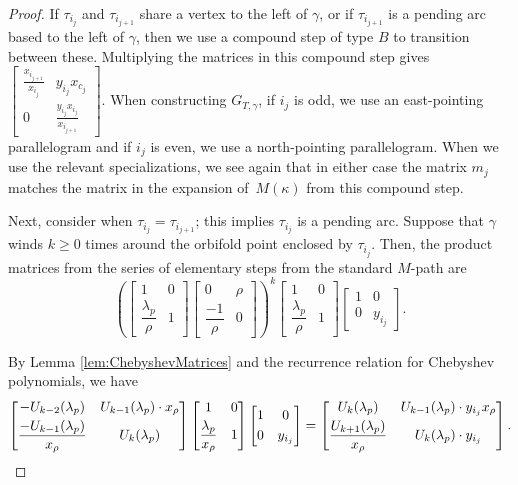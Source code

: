\documentclass[pdftex]{sigma}%
\numberwithin{equation}{section}
\begin{document}
\begin{proof}
If $\tau_{i_j}$ and $\tau_{i_{j+1}}$ share a vertex to the left of $\gamma$, or if $\tau_{i_{j+1}}$ is a pending arc based to the left of $\gamma$, then we use a compound step of type $B$ to transition between these. Multiplying the matrices in this compound step gives $\left[\begin{smallmatrix} \frac{x_{i_{j+1}}}{x_{i_j}} & y_{i_j}x_{c_j} \\ 0 & \frac{y_{i_j}x_{i_j}}{x_{i_{j+1}}} \end{smallmatrix}\right] $. When constructing $G_{T,\gamma}$, if $i_j$ is odd, we use an east-pointing parallelogram and if $i_j$ is even, we use a north-pointing parallelogram. When we use the relevant specializations, we see again that in either case the matrix $m_j$ matches the matrix in the expansion of~$M(\kappa)$ from this compound step.

Next, consider when $\tau_{i_j} = \tau_{i_{j+1}}$; this implies $\tau_{i_j}$ is a pending arc. Suppose that $\gamma$ winds $k \geq 0$ times around the orbifold point enclosed by $\tau_{i_j}$. Then, the product matrices from the series of elementary steps from the standard $M$-path are \[
\left( \begin{bmatrix} 1 & 0 \\ \dfrac{\lambda_p}{\rho} & 1 \end{bmatrix} \begin{bmatrix} 0 & \rho \\ \dfrac{-1}{\rho} & 0 \end{bmatrix} \right)^k \begin{bmatrix} 1 & 0 \\ \dfrac{\lambda_p}{\rho} & 1 \end{bmatrix} \begin{bmatrix} 1 & 0 \\ 0 & y_{i_j} \end{bmatrix}.
\]

By Lemma \ref{lem:ChebyshevMatrices} and the recurrence relation for Chebyshev polynomials, we have \[
\begin{bmatrix} -U_{k-2} (\lambda_p) & U_{k-1}(\lambda_p) \cdot x_\rho \vspace{1mm}\\ \dfrac{-U_{k-1}(\lambda_p)}{x_\rho} & U_k(\lambda_p) \end{bmatrix} \begin{bmatrix} 1 & 0 \vspace{1mm}\\ \dfrac{\lambda_p}{x_\rho} & 1 \end{bmatrix} \begin{bmatrix} 1 & 0 \vspace{1mm}\\ 0 & y_{i_j} \end{bmatrix} = \begin{bmatrix} U_k(\lambda_p) & U_{k-1}(\lambda_p) \cdot y_{i_j} x_\rho \vspace{1mm}\\ \dfrac{U_{k+1}(\lambda_p)}{x_\rho} & U_k(\lambda_p) \cdot y_{i_j} \end{bmatrix}.
\]


\end{proof}
\end{document}
